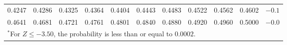 \begin{table}[p]
\begin{center}
{\begin{tabular}{| rrrrr | rrrrr | c}
  \footnotesize{0.4247} & \footnotesize{0.4286} & \footnotesize{0.4325} & \footnotesize{0.4364} & \footnotesize{0.4404} & \footnotesize{0.4443} & \footnotesize{0.4483} & \footnotesize{0.4522} & \footnotesize{0.4562} & \footnotesize{0.4602} & $-0.1$ \\
  \footnotesize{0.4641} & \footnotesize{0.4681} & \footnotesize{0.4721} & \footnotesize{0.4761} & \footnotesize{0.4801} & \footnotesize{0.4840} & \footnotesize{0.4880} & \footnotesize{0.4920} & \footnotesize{0.4960} & \footnotesize{0.5000} & $-0.0$ \\
    \hline
\multicolumn{11}{l}{{\normalsize$^*$For $Z \leq -3.50$, the probability is less than or equal to $0.0002$.}}
\end{tabular}}
\end{center}
\end{table}

